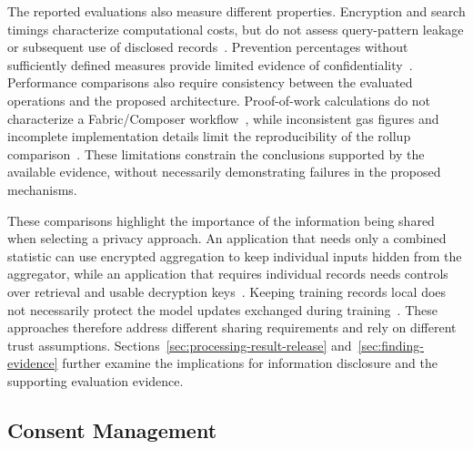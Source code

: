 The reported evaluations also measure different properties. Encryption and search timings characterize computational costs, but do not assess query-pattern leakage or subsequent use of disclosed records~\cite{updateGuan2025Healthcare}. Prevention percentages without sufficiently defined measures provide limited evidence of confidentiality~\cite{updateDhasaratha2024IoMT}. Performance comparisons also require consistency between the evaluated operations and the proposed architecture. Proof-of-work calculations do not characterize a Fabric/Composer workflow~\cite{updateMasood2024Patient}, while inconsistent gas figures and incomplete implementation details limit the reproducibility of the rollup comparison~\cite{updateMaZhang2024Rollup}. These limitations constrain the conclusions supported by the available evidence, without necessarily demonstrating failures in the proposed mechanisms.

These comparisons highlight the importance of the information being shared when selecting a privacy approach. An application that needs only a combined statistic can use encrypted aggregation to keep individual inputs hidden from the aggregator, while an application that requires individual records needs controls over retrieval and usable decryption keys~\cite{2021-priv-iot-homo,2021-system-medical-data-privacy,2018-towards-secure}. Keeping training records local does not necessarily protect the model updates exchanged during training~\cite{updateGupta2024LungFL}. These approaches therefore address different sharing requirements and rely on different trust assumptions. Sections~\ref{sec:processing-result-release} and~\ref{sec:finding-evidence} further examine the implications for information disclosure and the supporting evaluation evidence.

\subsection{Consent Management}

